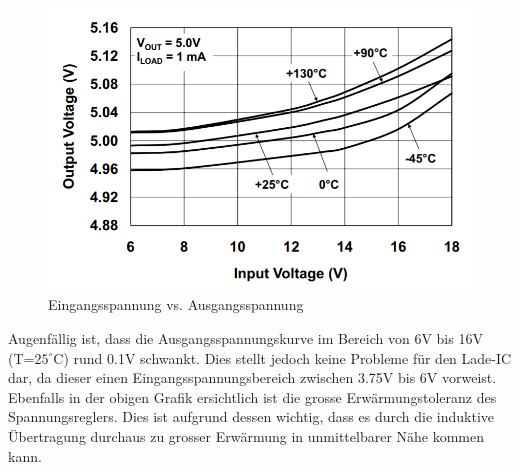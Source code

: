\begin{figure}[H]
	\begin{center}
		\includegraphics[width=120mm]{data/Linearregler_5V.png}
		\caption[MCP1703A Linearregler Spannungsverhalten]{Eingangsspannung vs. Ausgangsspannung \cite{MCP1703LinearRegulator}} %
		\label{fig:Linearregler 5V}
	\end{center}
\end{figure} 

Augenfällig ist, dass die Ausgangsspannungskurve im Bereich von 6V bis 16V (T=$25^\circ\text{C}$) rund 0.1V schwankt. Dies stellt jedoch keine Probleme für den Lade-IC dar, da dieser einen Eingangsspannungsbereich zwischen 3.75V bis 6V vorweist. Ebenfalls in der obigen Grafik ersichtlich ist die grosse Erwärmungstoleranz des Spannungsreglers. Dies ist aufgrund dessen wichtig, dass es durch die induktive Übertragung durchaus zu grosser Erwärmung in unmittelbarer Nähe kommen kann.